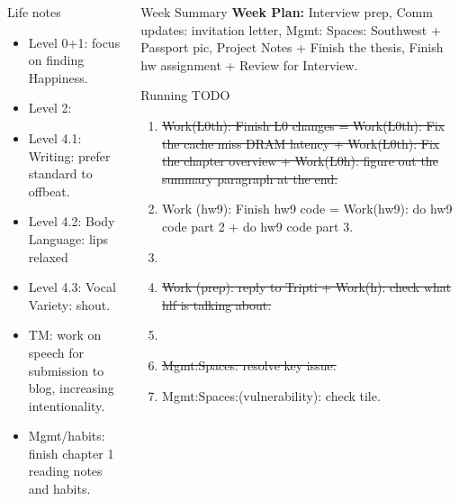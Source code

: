 \documentclass[serif, mathserif, final]{beamer}
\newcommand{\doneTask}[1]{\tiny \item \tiny \sout{#1}}
\begin{document}
\begin{frame}{}
\begin{columns}
\begin{column}{0.25\linewidth}
  \begin{block}{Life notes} 
    \begin{itemize} 
      \tiny \item \tiny Level 0+1: focus on finding Happiness. 
    \item \tiny Level 2: 
    \item \tiny Level 4.1: Writing: prefer standard to offbeat. 
    \item \tiny Level 4.2: Body Language: lips relaxed
    \item \tiny Level 4.3: Vocal Variety: shout. 
    \item \tiny TM: work on speech for submission to blog, increasing intentionality. 
    \item \tiny Mgmt/habits: finish chapter 1 reading notes and habits. 
    \end{itemize}     
  \end{block}
\end{column} %

\begin{column}{0.50\linewidth}

  \begin{block}{Week Summary}
    \textbf{Week Plan:} Interview prep, Comm updates: invitation
    letter, Mgmt: Spaces: Southwest + Passport pic, 
    Project Notes + Finish the thesis, Finish hw
    assignment + Review for Interview. \\
  \end{block} 

  \begin{block}{Running TODO} %
    \begin{enumerate} 
      \doneTask{Work(L0th): Finish L0 changes = Work(L0th):
      Fix the cache miss DRAM latency + Work(L0th): Fix the chapter
      overview + Work(L0h): figure out the summary paragraph at the
      end.}
    \item \tiny Work (hw9): Finish hw9 code = Work(hw9): do hw9 code
      part 2 + do hw9 code part 3. 
    \item \tiny \doneTask{Work (prep): reply to Tripti + Work(h): check what hlf
      is talking about. }
    \item \tiny \doneTask{Mgmt:Spaces: resolve key issue.}
    \item \tiny Mgmt:Spaces:(vulnerability): check tile. 
   \end{enumerate}
  \end{block}


\end{column}
\end{columns}
\end{frame}
\end{document}

